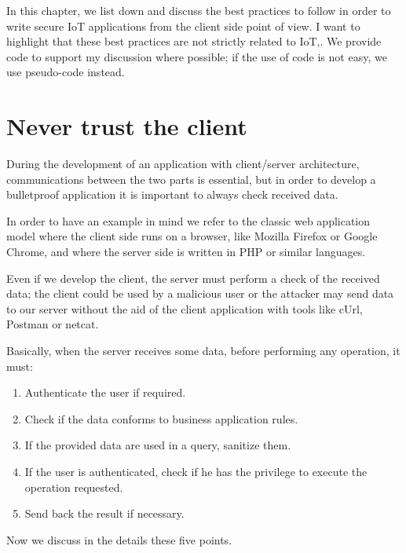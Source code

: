 In this chapter, we list down and discuss the best practices to follow in order to write secure IoT applications from the client side point of view.\newline
I want to highlight that these best practices are not strictly related to IoT,.\newline
We provide code to support my discussion where possible; if the use of code is not easy, we use pseudo-code instead.\newline

\section{Never trust the client}
During the development of an application with client/server architecture, communications between the two parts is essential, but in order to develop a bulletproof application it is important to always check received data.\newline

In order to have an example in mind we refer to the classic web application model where the client side runs on a browser, like Mozilla Firefox or Google Chrome, and where the server side is written in PHP or similar languages.\newline

Even if we develop the client, the server must perform a check of the  received data; the client could be used by a malicious user or the attacker may send data to our server without the aid of the client application with tools like cUrl, Postman or netcat.\newline

Basically, when the server receives some data, before performing any operation, it must:
\begin{enumerate}
	\item Authenticate the user if required.
	\item Check if the data conforms to business application rules.
	\item If the provided data are used in a query, sanitize them.
	\item If the user is authenticated, check if he has the privilege to execute the operation requested.
	\item Send back the result if necessary.
\end{enumerate}

Now we discuss in the details these five points.\newline

